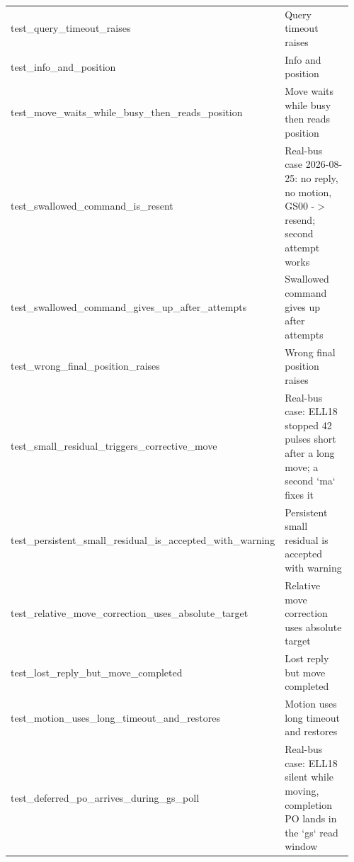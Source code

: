 \begin{longtable}{@{}>{\ttfamily\scriptsize\raggedright\arraybackslash}p{0.40\linewidth} >{\footnotesize\raggedright\arraybackslash}p{0.555\linewidth}@{}}
test\_\allowbreak{}query\_\allowbreak{}timeout\_\allowbreak{}raises & Query timeout raises \\
test\_\allowbreak{}info\_\allowbreak{}and\_\allowbreak{}position & Info and position \\
test\_\allowbreak{}move\_\allowbreak{}waits\_\allowbreak{}while\_\allowbreak{}busy\_\allowbreak{}then\_\allowbreak{}reads\_\allowbreak{}position & Move waits while busy then reads position \\
test\_\allowbreak{}swallowed\_\allowbreak{}command\_\allowbreak{}is\_\allowbreak{}resent & Real-bus case 2026-08-25: no reply, no motion, GS00 -$>$ resend; second attempt works \\
test\_\allowbreak{}swallowed\_\allowbreak{}command\_\allowbreak{}gives\_\allowbreak{}up\_\allowbreak{}after\_\allowbreak{}attempts & Swallowed command gives up after attempts \\
test\_\allowbreak{}wrong\_\allowbreak{}final\_\allowbreak{}position\_\allowbreak{}raises & Wrong final position raises \\
test\_\allowbreak{}small\_\allowbreak{}residual\_\allowbreak{}triggers\_\allowbreak{}corrective\_\allowbreak{}move & Real-bus case: ELL18 stopped 42 pulses short after a long move; a second `ma` fixes it \\
test\_\allowbreak{}persistent\_\allowbreak{}small\_\allowbreak{}residual\_\allowbreak{}is\_\allowbreak{}accepted\_\allowbreak{}with\_\allowbreak{}warning & Persistent small residual is accepted with warning \\
test\_\allowbreak{}relative\_\allowbreak{}move\_\allowbreak{}correction\_\allowbreak{}uses\_\allowbreak{}absolute\_\allowbreak{}target & Relative move correction uses absolute target \\
test\_\allowbreak{}lost\_\allowbreak{}reply\_\allowbreak{}but\_\allowbreak{}move\_\allowbreak{}completed & Lost reply but move completed \\
test\_\allowbreak{}motion\_\allowbreak{}uses\_\allowbreak{}long\_\allowbreak{}timeout\_\allowbreak{}and\_\allowbreak{}restores & Motion uses long timeout and restores \\
test\_\allowbreak{}deferred\_\allowbreak{}po\_\allowbreak{}arrives\_\allowbreak{}during\_\allowbreak{}gs\_\allowbreak{}poll & Real-bus case: ELL18 silent while moving, completion PO lands in the `gs` read window \\

\end{longtable}
